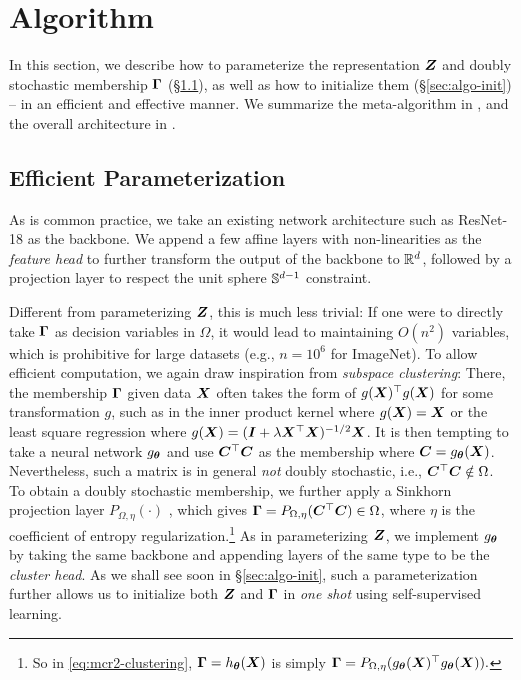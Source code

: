 \documentclass[10pt,twocolumn,letterpaper]{article}
\begin{document}
   
   
   
   
   
   


   






   \section{Algorithm} \label{sec:algo}
   In this section, we describe how to parameterize the representation ${\bm{Z}}$ and doubly stochastic membership $\boldsymbol{\Gamma}$ (\S \ref{sec:algo-param}), as well as how to initialize them (\S \ref{sec:algo-init}) -- in an efficient and effective manner. We summarize the meta-algorithm in , and the overall architecture in . 
   
   
   \subsection{Efficient Parameterization} \label{sec:algo-param}
    As is common practice, we take an existing network architecture such as ResNet-18 as the backbone. We append a few affine layers with non-linearities as the \textit{feature head} to further transform the output of the backbone to ${\mathbb{R}}^{d}$, followed by a projection layer to respect the unit sphere ${\mathbb{S}}^{d-1}$ constraint.
   



    Different from parameterizing ${\bm{Z}}$, this is much less trivial: If one were to directly take $\boldsymbol{\Gamma}$ as decision variables in $\Omega$, it would lead to maintaining $O(n^2)$ variables, which is prohibitive for large datasets (e.g., $n=10^6$ for ImageNet). To allow efficient computation, we again draw inspiration from \textit{subspace clustering}: There, the membership $\boldsymbol{\Gamma}$ given data ${\bm{X}}$ often takes the form of $g({\bm{X}})^\top g({\bm{X}})$ for some transformation $g$, such as in the inner product kernel \cite{Heckel2015-hm,Ding2022-zd} where $g({\bm{X}})={\bm{X}}$ or the least square regression \cite{Lu2012-lz} where $g({\bm{X}})=({\bm{I}}+\lambda{\bm{X}}^\top{\bm{X}})^{-1/2}{\bm{X}}$. It is then tempting to take a neural network $g_{\boldsymbol{\theta}}$ and use  ${\bm{C}}^\top {\bm{C}}$ as the membership where ${\bm{C}}=g_{\boldsymbol{\theta}}({\bm{X}})$. Nevertheless, such a matrix is in general \textit{not} doubly stochastic, i.e., ${\bm{C}}^\top {\bm{C}}\notin\Omega$. To obtain a doubly stochastic membership, we further apply a Sinkhorn projection layer $P_{\Omega, \eta}(\cdot)$ \cite{Sander2021-tl,Eisenberger2022-oo}, which gives $\boldsymbol{\Gamma}=P_{\Omega, \eta}({\bm{C}}^\top {\bm{C}})\in \Omega$, where $\eta$ is the coefficient of entropy regularization.\footnote{So in \eqref{eq:mcr2-clustering}, $\boldsymbol{\Gamma}=h_{\boldsymbol{\theta}}({\bm{X}})$ is simply $\boldsymbol{\Gamma}=P_{\Omega, \eta}(g_{\boldsymbol{\theta}}({\bm{X}})^\top g_{\boldsymbol{\theta}}({\bm{X}})).$ 
   } As in parameterizing ${\bm{Z}}$, we implement $g_{\boldsymbol{\theta}}$ by taking the same backbone and appending layers of the same type to be the \textit{cluster head}. As we shall see soon in \S \ref{sec:algo-init}, such a parameterization further allows us to initialize both ${\bm{Z}}$ and $\boldsymbol{\Gamma}$ in \textit{one shot} using self-supervised learning.
\end{document}
